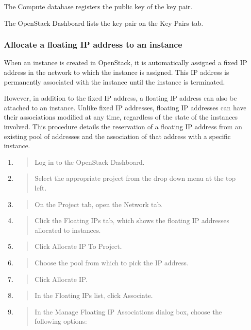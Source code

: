 {The Compute database registers the public key of the key pair.

The \gls{OpenStack Dashboard} lists the key pair on the Key Pairs tab.

\subsubsection{Allocate a floating IP address to an instance}\label{allocate-a-floating-ip-address-to-an-instance}

When an instance is created in \gls{OpenStack}, it is automatically assigned a
fixed IP address in the network to which the instance is assigned. This
IP address is permanently associated with the instance until the
instance is terminated.

However, in addition to the fixed IP address, a floating IP address can
also be attached to an instance. Unlike fixed IP addresses, floating IP
addresses can have their associations modified at any time, regardless
of the state of the instances involved. This procedure details the
reservation of a floating IP address from an existing pool of addresses
and the association of that address with a specific instance.

\begin{enumerate}
\def\labelenumi{\arabic{enumi}.}
\item
  \begin{quote}
  Log in to the \gls{OpenStack Dashboard}.
  \end{quote}
\item
  \begin{quote}
  Select the appropriate project from the drop down menu at the top
  left.
  \end{quote}
\item
  \begin{quote}
  On the Project tab, open the Network tab.
  \end{quote}
\item
  \begin{quote}
  Click the Floating IPs tab, which shows the floating IP addresses
  allocated to instances.
  \end{quote}
\item
  \begin{quote}
  Click Allocate IP To Project.
  \end{quote}
\item
  \begin{quote}
  Choose the pool from which to pick the IP address.
  \end{quote}
\item
  \begin{quote}
  Click Allocate IP.
  \end{quote}
\item
  \begin{quote}
  In the Floating IPs list, click Associate.
  \end{quote}
\item
  \begin{quote}
  In the Manage Floating IP Associations dialog box, choose the
  following options:
  \end{quote}


\end{enumerate}}
